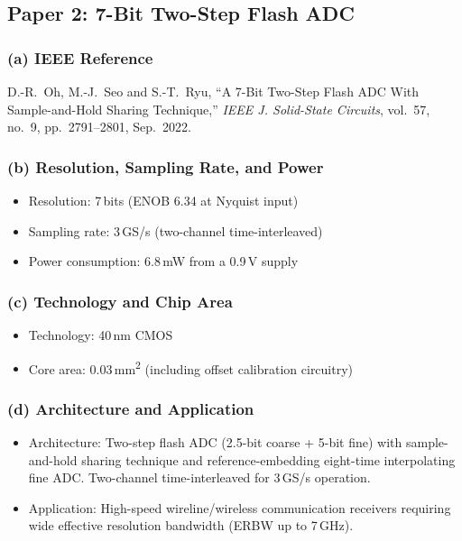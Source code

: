 \documentclass{article}
\begin{document}
  \subsection{Paper 2: 7-Bit Two-Step Flash ADC}

  \subsubsection*{(a) IEEE Reference}
  D.-R.~Oh, M.-J.~Seo and S.-T.~Ryu,
  ``A 7-Bit Two-Step Flash ADC With Sample-and-Hold Sharing Technique,''
  \textit{IEEE J. Solid-State Circuits}, vol.~57, no.~9, pp.~2791--2801, Sep.~2022.

  \subsubsection*{(b) Resolution, Sampling Rate, and Power}
  \begin{itemize}
      \item Resolution: 7\,bits (ENOB 6.34 at Nyquist input)
      \item Sampling rate: 3\,GS/s (two-channel time-interleaved)
      \item Power consumption: 6.8\,mW from a 0.9\,V supply
  \end{itemize}

  \subsubsection*{(c) Technology and Chip Area}
  \begin{itemize}
      \item Technology: 40\,nm CMOS
      \item Core area: 0.03\,mm\textsuperscript{2} (including offset calibration circuitry)
  \end{itemize}

  \subsubsection*{(d) Architecture and Application}
  \begin{itemize}
      \item Architecture: Two-step flash ADC (2.5-bit coarse + 5-bit fine) with sample-and-hold sharing technique and
  reference-embedding eight-time interpolating fine ADC. Two-channel time-interleaved for 3\,GS/s operation.
      \item Application: High-speed wireline/wireless communication receivers requiring wide effective resolution bandwidth
  (ERBW up to 7\,GHz).
  \end{itemize}
\end{document}
